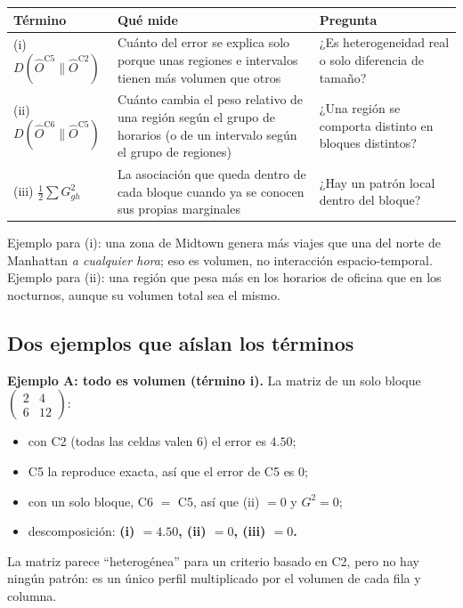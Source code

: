 \documentclass[11pt,a4paper]{article}
\begin{document}
\begin{center}
\renewcommand{\arraystretch}{1.3}
\begin{tabular}{@{}>{\raggedright\arraybackslash}p{2.6cm}>{\raggedright\arraybackslash}p{6.8cm}>{\raggedright\arraybackslash}p{4.4cm}@{}}
\toprule
\textbf{Término} & \textbf{Qué mide} & \textbf{Pregunta} \\
\midrule
(i) $D(\hat O^{\mathrm{C5}}\|\hat O^{\mathrm{C2}})$ & Cuánto del error se explica solo porque unas regiones e intervalos tienen más volumen que otros & ¿Es heterogeneidad real o solo diferencia de tamaño? \\
\midrule
(ii) $D(\hat O^{\mathrm{C6}}\|\hat O^{\mathrm{C5}})$ & Cuánto cambia el peso relativo de una región según el grupo de horarios (o de un intervalo según el grupo de regiones) & ¿Una región se comporta distinto en bloques distintos? \\
\midrule
(iii) $\tfrac12\sum G^2_{gh}$ & La asociación que queda dentro de cada bloque cuando ya se conocen sus propias marginales & ¿Hay un patrón local dentro del bloque? \\
\bottomrule
\end{tabular}
\end{center}
Ejemplo para (i): una zona de Midtown genera más viajes que una del norte de
Manhattan \emph{a cualquier hora}; eso es volumen, no interacción espacio-temporal.
Ejemplo para (ii): una región que pesa más en los horarios de oficina que en los
nocturnos, aunque su volumen total sea el mismo.

\subsection{Dos ejemplos que aíslan los términos}

\textbf{Ejemplo A: todo es volumen (término i).} La matriz de un solo bloque
$\begin{pmatrix}2&4\\6&12\end{pmatrix}$:
\begin{itemize}
  \item con C2 (todas las celdas valen 6) el error es $\mathbf{4.50}$;
  \item C5 la reproduce exacta, así que el error de C5 es 0;
  \item con un solo bloque, C6 $=$ C5, así que (ii) $=0$ y $G^2=0$;
  \item descomposición: \textbf{(i) $=4.50$, (ii) $=0$, (iii) $=0$.}
\end{itemize}
La matriz parece ``heterogénea'' para un criterio basado en C2, pero no hay ningún
patrón: es un único perfil multiplicado por el volumen de cada fila y columna.
\end{document}
